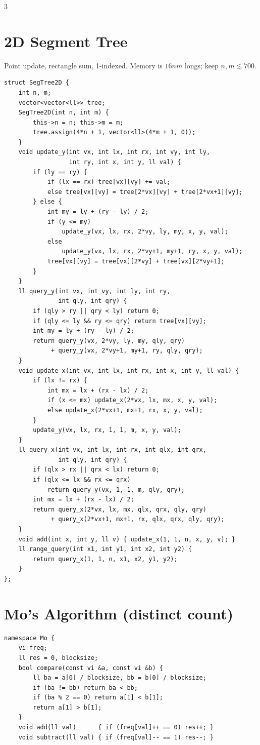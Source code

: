 \documentclass[10pt]{article}
\newcommand{\note}[1]{{\scriptsize #1}\par}
\begin{document}
\begin{multicols*}{3}
\section{2D Segment Tree}
\note{Point update, rectangle sum, 1-indexed. Memory is $16nm$ longs; keep $n,m\lesssim 700$.}
\begin{lstlisting}
struct SegTree2D {
    int n, m;
    vector<vector<ll>> tree;
    SegTree2D(int n, int m) {
        this->n = n; this->m = m;
        tree.assign(4*n + 1, vector<ll>(4*m + 1, 0));
    }
    void update_y(int vx, int lx, int rx, int vy, int ly,
                  int ry, int x, int y, ll val) {
        if (ly == ry) {
            if (lx == rx) tree[vx][vy] += val;
            else tree[vx][vy] = tree[2*vx][vy] + tree[2*vx+1][vy];
        } else {
            int my = ly + (ry - ly) / 2;
            if (y <= my)
                update_y(vx, lx, rx, 2*vy, ly, my, x, y, val);
            else
                update_y(vx, lx, rx, 2*vy+1, my+1, ry, x, y, val);
            tree[vx][vy] = tree[vx][2*vy] + tree[vx][2*vy+1];
        }
    }
    ll query_y(int vx, int vy, int ly, int ry,
               int qly, int qry) {
        if (qly > ry || qry < ly) return 0;
        if (qly <= ly && ry <= qry) return tree[vx][vy];
        int my = ly + (ry - ly) / 2;
        return query_y(vx, 2*vy, ly, my, qly, qry)
             + query_y(vx, 2*vy+1, my+1, ry, qly, qry);
    }
    void update_x(int vx, int lx, int rx, int x, int y, ll val) {
        if (lx != rx) {
            int mx = lx + (rx - lx) / 2;
            if (x <= mx) update_x(2*vx, lx, mx, x, y, val);
            else update_x(2*vx+1, mx+1, rx, x, y, val);
        }
        update_y(vx, lx, rx, 1, 1, m, x, y, val);
    }
    ll query_x(int vx, int lx, int rx, int qlx, int qrx,
               int qly, int qry) {
        if (qlx > rx || qrx < lx) return 0;
        if (qlx <= lx && rx <= qrx)
            return query_y(vx, 1, 1, m, qly, qry);
        int mx = lx + (rx - lx) / 2;
        return query_x(2*vx, lx, mx, qlx, qrx, qly, qry)
             + query_x(2*vx+1, mx+1, rx, qlx, qrx, qly, qry);
    }
    void add(int x, int y, ll v) { update_x(1, 1, n, x, y, v); }
    ll range_query(int x1, int y1, int x2, int y2) {
        return query_x(1, 1, n, x1, x2, y1, y2);
    }
};
\end{lstlisting}

\section{Mo's Algorithm (distinct count)}
\begin{lstlisting}
namespace Mo {
    vi freq;
    ll res = 0, blocksize;
    bool compare(const vi &a, const vi &b) {
        ll ba = a[0] / blocksize, bb = b[0] / blocksize;
        if (ba != bb) return ba < bb;
        if (ba % 2 == 0) return a[1] < b[1];
        return a[1] > b[1];
    }
    void add(ll val)      { if (freq[val]++ == 0) res++; }
    void subtract(ll val) { if (freq[val]-- == 1) res--; }


\end{lstlisting}
\end{multicols*}
\end{document}
